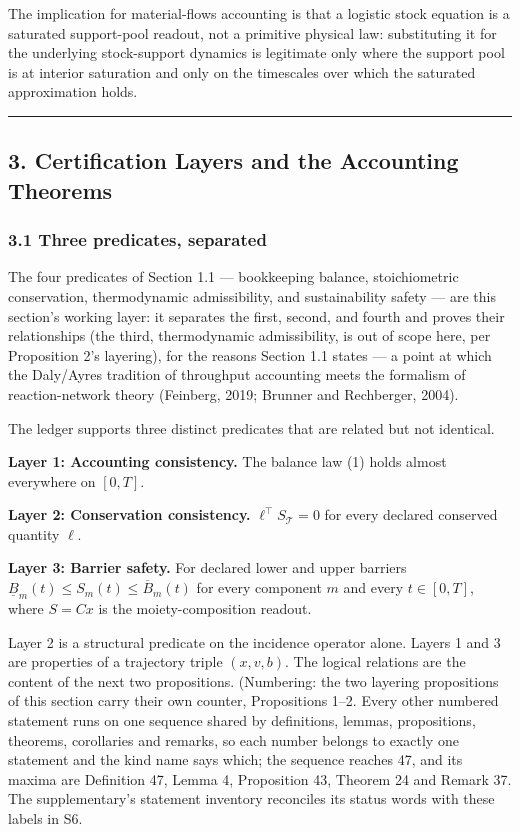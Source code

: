 \documentclass[11pt]{article}
\begin{document}
The implication for material-flows accounting is that a logistic stock
equation is a saturated support-pool readout, not a primitive physical
law: substituting it for the underlying stock-support dynamics is
legitimate only where the support pool is at interior saturation and
only on the timescales over which the saturated approximation holds.

\begin{center}\rule{0.5\linewidth}{0.5pt}\end{center}

\subsection{3. Certification Layers and the Accounting
Theorems}\label{certification-layers-and-the-accounting-theorems}

\subsubsection{3.1 Three predicates,
separated}\label{three-predicates-separated}

The four predicates of Section 1.1 --- bookkeeping balance,
stoichiometric conservation, thermodynamic admissibility, and
sustainability safety --- are this section's working layer: it separates
the first, second, and fourth and proves their relationships (the third,
thermodynamic admissibility, is out of scope here, per Proposition 2's
layering), for the reasons Section 1.1 states --- a point at which the
Daly/Ayres tradition of throughput accounting meets the formalism of
reaction-network theory (Feinberg, 2019; Brunner and Rechberger, 2004).

The ledger supports three distinct predicates that are related but not
identical.

\textbf{Layer 1: Accounting consistency.} The balance law (1) holds
almost everywhere on \([0,T]\).

\textbf{Layer 2: Conservation consistency.}
\(\ell^\top S_{\mathcal{T}} = 0\) for every declared conserved quantity
\(\ell\).

\textbf{Layer 3: Barrier safety.} For declared lower and upper barriers
\(\underline{B}_m(t) \le S_m(t) \le \overline{B}_m(t)\) for every
component \(m\) and every \(t \in [0,T]\), where \(S = Cx\) is the
moiety-composition readout.

Layer 2 is a structural predicate on the incidence operator alone.
Layers 1 and 3 are properties of a trajectory triple \((x, v, b)\). The
logical relations are the content of the next two propositions.
(Numbering: the two layering propositions of this section carry their own counter, Propositions 1--2. Every other numbered statement runs on one sequence shared by definitions, lemmas, propositions, theorems, corollaries and remarks, so each number belongs to exactly one statement and the kind name says which; the sequence reaches 47, and its maxima are Definition 47, Lemma 4, Proposition 43, Theorem 24 and Remark 37. The supplementary's statement inventory reconciles its status words with these labels in S6.
\end{document}
